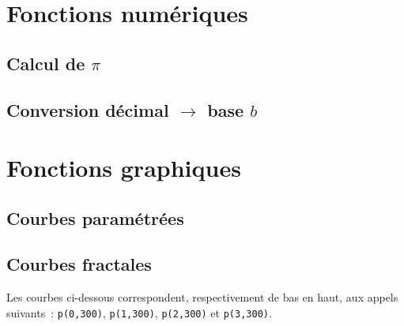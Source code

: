 \documentclass[11pt,a4paper]{article}
\begin{document}

\section{Fonctions numériques}

\subsection{Calcul de $\pi$}


\subsection{Conversion décimal $\rightarrow$ base $b$}


\section{Fonctions graphiques}

\subsection{Courbes paramétrées}


\subsection{Courbes fractales}


Les courbes ci-dessous correspondent, respectivement de bas en haut, 
aux appels suivants~:
{\tt p(0,300)}, {\tt p(1,300)}, {\tt p(2,300)} et {\tt p(3,300)}.
\vspace*{1cm}
\end{document}
